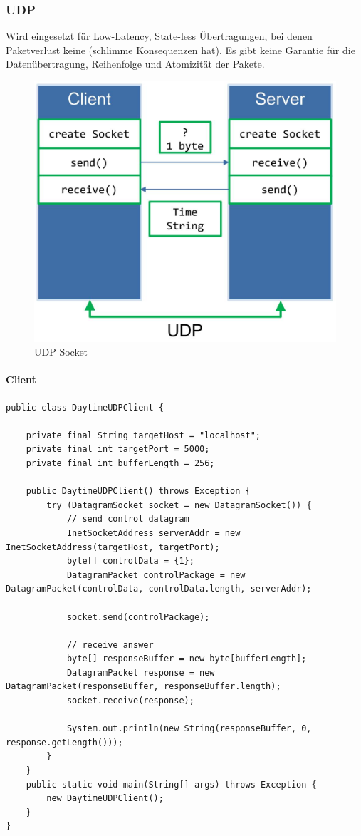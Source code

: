 \clearpage

\subsubsection{UDP}
Wird eingesetzt für Low-Latency, State-less Übertragungen, bei denen Paketverlust keine (schlimme Konsequenzen hat). Es gibt keine Garantie für die Datenübertragung, Reihenfolge und Atomizität der Pakete.
\begin{figure}[h!]
	\centering
	\includegraphics[width=0.5\linewidth]{img/udp_socket}
	\caption{UDP Socket}
	\label{fig:udpsocket}
\end{figure}

\paragraph{Client} \hfill
\begin{lstlisting}
public class DaytimeUDPClient {
	
	private final String targetHost = "localhost";
	private final int targetPort = 5000;
	private final int bufferLength = 256;
	
	public DaytimeUDPClient() throws Exception {
		try (DatagramSocket socket = new DatagramSocket()) {
			// send control datagram
			InetSocketAddress serverAddr = new InetSocketAddress(targetHost, targetPort);
			byte[] controlData = {1};
			DatagramPacket controlPackage = new DatagramPacket(controlData, controlData.length, serverAddr);
			
			socket.send(controlPackage);
			
			// receive answer
			byte[] responseBuffer = new byte[bufferLength];
			DatagramPacket response = new DatagramPacket(responseBuffer, responseBuffer.length);
			socket.receive(response);
			
			System.out.println(new String(responseBuffer, 0, response.getLength()));
		} 
	}
	public static void main(String[] args) throws Exception {
		new DaytimeUDPClient();
	}
}
\end{lstlisting}

